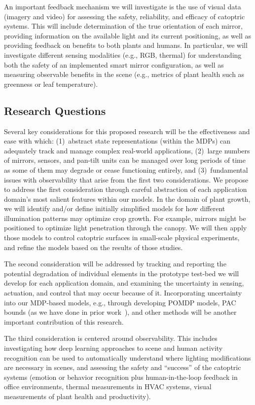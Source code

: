 An important feedback mechanism we will investigate is the use of visual
data (imagery and video) for assessing the safety, reliability, and
efficacy of catoptric systems. This will include determination of the true
orientation of each mirror, providing information on the available
light and its current positioning, as well as providing feedback on
benefits to both plants and humans.
In particular, we will investigate different sensing modalities (e.g., RGB,
thermal) for understanding both the safety of an implemented smart mirror
configuration, as well as measuring observable benefits in the scene (e.g.,
metrics of plant health such as greenness or leaf temperature).

\subsection{Research Questions}
\label{sec:rq}


Several key considerations for this proposed research will be the effectiveness
and ease with which: (1)~abstract state representations (within the MDPs) can
adequately track and manage complex real-world applications, (2)~large numbers
of mirrors, sensors, and pan-tilt units can be managed over long periods of
time as some of them may degrade or cease functioning entirely, and
(3)~fundamental issues with observability that arise from the first two
considerations.  We propose to address the first consideration through careful
abstraction of each application domain's most salient features within our
models.  In the domain of plant growth, we will 
identify and/or define initially simplified
models for how different illumination patterns may optimize crop growth.
For example, mirrors might be positioned to optimize light penetration
through the canopy.
We will then apply those models to control catoptric surfaces in small-scale
physical experiments, and refine the models based on the results of those
studies.

The second consideration will be addressed by tracking and reporting
the potential degradation of individual elements in the prototype test-bed we
will develop for each application domain, and examining the uncertainty in
sensing, actuation, and control that may occur because of it.  Incorporating
uncertainty into our MDP-based models, e.g., through developing POMDP models,
PAC bounds (as we have done in prior work~\cite{gtgs10}),
and other methods will be another important contribution of this
research.

The third consideration is centered around observability. 
This includes investigating how deep learning approaches to scene and
human activity recognition can be used to automatically understand where
lighting modifications are necessary in scenes, and 
assessing the safety and ``success'' of the catoptric systems
(emotion or behavior recognition plus human-in-the-loop feedback
in office environments, thermal measurements in HVAC systems,
visual measurements of plant health and productivity).

